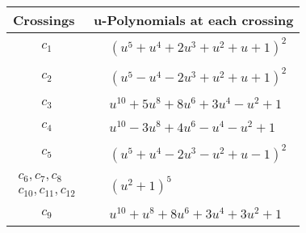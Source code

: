 \documentclass[1p]{elsarticle_modified}
\theoremstyle{definition}
\begin{document}
\begin{tabular}{m{50pt}|m{274pt}}
Crossings & \hspace{64pt}u-Polynomials at each crossing \\
\hline $$\begin{aligned}c_{1}\end{aligned}$$&$\begin{aligned}
&(u^5+u^4+2 u^3+u^2+u+1)^2
\end{aligned}$\\
\hline $$\begin{aligned}c_{2}\end{aligned}$$&$\begin{aligned}
&(u^5- u^4-2 u^3+u^2+u+1)^2
\end{aligned}$\\
\hline $$\begin{aligned}c_{3}\end{aligned}$$&$\begin{aligned}
&u^{10}+5 u^8+8 u^6+3 u^4- u^2+1
\end{aligned}$\\
\hline $$\begin{aligned}c_{4}\end{aligned}$$&$\begin{aligned}
&u^{10}-3 u^8+4 u^6- u^4- u^2+1
\end{aligned}$\\
\hline $$\begin{aligned}c_{5}\end{aligned}$$&$\begin{aligned}
&(u^5+u^4-2 u^3- u^2+u-1)^2
\end{aligned}$\\
\hline $$\begin{aligned}c_{6},c_{7},c_{8}\\c_{10},c_{11},c_{12}\end{aligned}$$&$\begin{aligned}
&(u^2+1)^5
\end{aligned}$\\
\hline $$\begin{aligned}c_{9}\end{aligned}$$&$\begin{aligned}
&u^{10}+u^8+8 u^6+3 u^4+3 u^2+1
\end{aligned}$\\
\hline
\end{tabular}\\~\\
\newpage\renewcommand{\arraystretch}{1}
\end{document}
